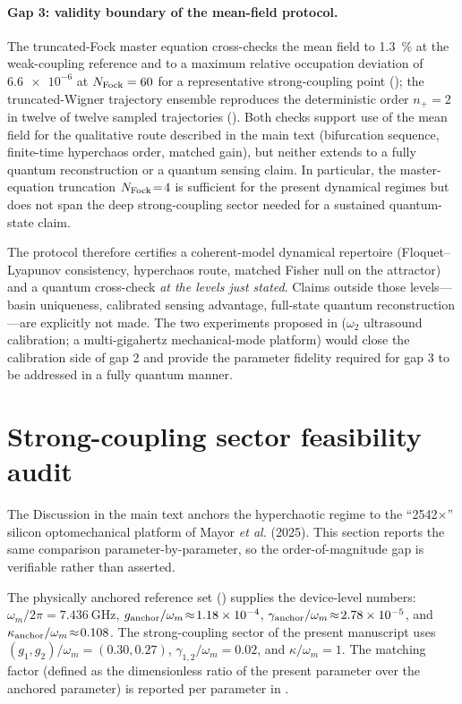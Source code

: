 \documentclass[Phys]{SciPost}
\begin{document}
\paragraph{Gap 3: validity boundary of the mean-field protocol.}
The truncated-Fock master equation cross-checks the mean field to \qty{1.3}{\percent} at the weak-coupling reference and to a maximum relative occupation deviation of $\num{6.6e-6}$ at $N_{\rm Fock}=\num{60}$ for a representative strong-coupling point ();
the truncated-Wigner trajectory ensemble reproduces the deterministic order
$n_+\!=\!2$ in twelve of twelve sampled trajectories ().
Both checks support use of the mean field for the qualitative route
described in the main text (bifurcation sequence, finite-time hyperchaos order,
matched gain), but neither extends to a fully quantum reconstruction or a
quantum sensing claim. In particular,
the master-equation truncation $N_{\rm Fock}\!=\!4$ is sufficient for the
present dynamical regimes but does not span the deep strong-coupling sector
needed for a sustained quantum-state claim.

The protocol therefore certifies a coherent-model dynamical repertoire
(Floquet--Lyapunov consistency, hyperchaos route, matched Fisher null on the
attractor) and a quantum cross-check \emph{at the levels just stated}. Claims
outside those levels---basin uniqueness, calibrated sensing advantage,
full-state quantum reconstruction---are explicitly not made. The two
experiments proposed in  ($\omega_2$ ultrasound
calibration; a multi-gigahertz mechanical-mode platform) would close the
calibration side of gap 2 and provide the parameter fidelity required for
gap 3 to be addressed in a fully quantum manner.

\section{Strong-coupling sector feasibility audit}
\label{SI-sec:feasibility-audit}

The Discussion in the main text anchors the hyperchaotic regime to the
``2542$\times$'' silicon optomechanical platform of Mayor \emph{et al.}
(2025). This section reports the same comparison parameter-by-parameter, so
the order-of-magnitude gap is verifiable rather than asserted.

The physically anchored reference set () supplies the
device-level numbers: $\omega_m/2\pi=\qty{7.436}{\giga\hertz}$, $g_{\rm anchor}/\omega_m\!\approx\!\num{1.18e-4}$, $\gamma_{\rm anchor}/\omega_m\!\approx\!\num{2.78e-5}$,
and $\kappa_{\rm anchor}/\omega_m\!\approx\!\num{0.108}$. The strong-coupling
sector of the present manuscript uses $(g_1,g_2)/\omega_m\!=\!(\num{0.30},\num{0.27})$,
$\gamma_{1,2}/\omega_m\!=\!\num{0.02}$, and $\kappa/\omega_m\!=\!1$. The
matching factor (defined as the dimensionless ratio of the present parameter
over the anchored parameter) is reported per parameter in
.
\end{document}
